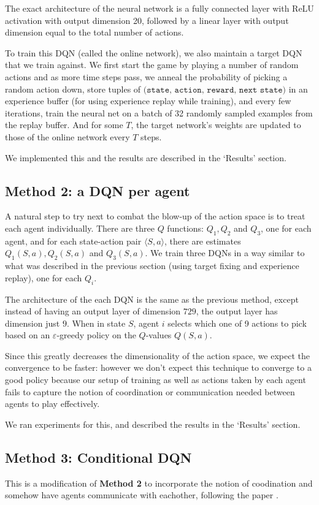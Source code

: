 \documentclass{article}
\begin{document}
The exact architecture of the neural network is
a fully connected layer with ReLU activation
with output dimension 20, followed by
a linear layer with output dimension
equal to the total number of actions.

To train this DQN (called the online network), we also maintain
a target DQN that we train against. We first start the game
by playing a number of random actions and as
more time steps pass, we anneal the
probability of picking a random action down,
store tuples of 
$\texttt{(state, action, reward, next state)}$
in an experience buffer (for using experience
replay while training), and every few iterations,
train the neural net on a batch of 32 randomly
sampled examples from the replay buffer. And
for some $T$, the target network's weights
are updated to those of the online network every
$T$ steps.

We implemented this and the results are described in
the `Results' section.

\subsection{Method 2: a DQN per agent}
A natural step to try next to combat the blow-up
of the action space is to treat each agent
individually. There are three $Q$ functions:
$Q_1, Q_2$ and $Q_3$, one for each agent, and
for each state-action pair $\langle S,a\rangle$,
there are estimates $Q_1(S,a),Q_2(S,a)$ and
$Q_3(S,a)$. We train three DQNs in a way similar
to what was described in the previous section
(using target fixing and experience replay), one for
each $Q_i$.

The architecture of the each DQN is the same as the
previous method, except instead of having an output
layer of dimension $729$, the output layer has dimension
just $9$. When in state $S$, agent $i$ selects which one
of 9 actions to pick based on an $\varepsilon$-greedy policy
on the $Q$-values $Q(S,a)$.

Since this greatly decreases the dimensionality of
the action space, we expect the convergence to be
faster: however we don't expect this technique to
converge to a good policy because our setup
of training as well as actions taken by each agent
fails to capture the notion of coordination or
communication needed between agents to play effectively.

We ran experiments for this, and described the results in
the `Results' section.

\subsection{Method 3: Conditional DQN}
This is a modification of \textbf{Method 2} to incorporate
the notion of coodination and somehow have agents communicate
with eachother, following the paper \cite{foerster2016learning}.
\end{document}
